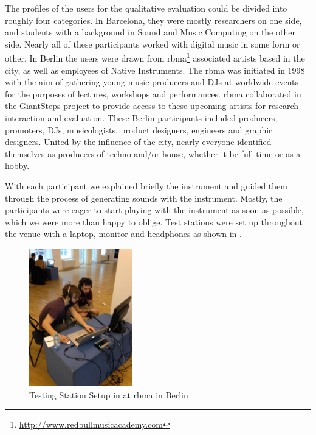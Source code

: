The profiles of the users for the qualitative evaluation could be divided into roughly four categories. In Barcelona, they were mostly researchers on one side, and students with a background in Sound and Music Computing on the other side. Nearly all of these participants worked with digital music in some form or other. In Berlin the users were drawn from \acrfull{rbma}\footnote{\url{http://www.redbullmusicacademy.com}} associated artists based in the city, as well as employees of Native Instruments. The \acrshort{rbma} was initiated in 1998 with the aim of gathering young music producers and DJs at worldwide events for the purposes of lectures, workshops and performances. \acrshort{rbma} collaborated in the GiantSteps project \citep{Knees2015} to provide access to these upcoming artists for research interaction and evaluation. These Berlin participants included producers, promoters, DJs, musicologists, product designers, engineers and graphic designers. United by the influence of the city, nearly everyone identified themselves as producers of techno and/or house, whether it be full-time or as a hobby.

With each participant we explained briefly the instrument and guided them through the process of generating sounds with the instrument. Mostly, the participants were eager to start playing with the instrument as soon as possible, which we were more than happy to oblige. Test stations were set up throughout the venue with a laptop, monitor and headphones as shown in .

\begin{figure}
	\begin{center}
		\includegraphics[width=0.4\textwidth]{ch07_evaluation/figures/berlin.jpg}
	\end{center}
	\caption[Testing Station Setup at Red Bull Music Academy in Berlin]{Testing Station Setup in at \acrshort{rbma} in Berlin}
	\label{fig:berlin}
\end{figure}


